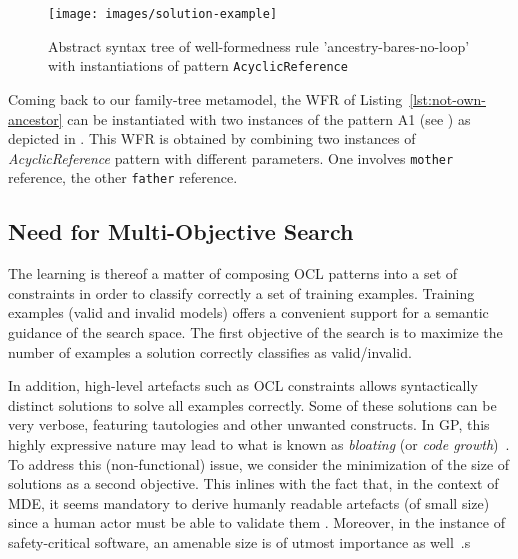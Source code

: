 \begin{figure}[h]
	\texttt{[image: images/solution-example]}
	\caption{Abstract syntax tree of well-formedness rule 'ancestry-bares-no-loop' with instantiations of pattern \texttt{AcyclicReference}}
	\label{fig:representation-pattern}
\end{figure}

Coming back to our family-tree metamodel, the WFR of Listing~\ref{lst:not-own-ancestor}  can be instantiated with two instances of the pattern A1 (see ) as depicted in . This WFR is obtained by combining two instances of \textit{AcyclicReference} pattern with different parameters. One involves \texttt{mother} reference, the other \texttt{father} reference.


\subsection{Need for Multi-Objective Search}
\label{sec:fitness}
The learning is thereof a matter of composing OCL patterns into a set of constraints in order to classify correctly a set of training examples.
Training examples (\ie valid and invalid models) offers a convenient support for a semantic guidance of the search space. The first objective of the search is to maximize the number of examples a solution correctly classifies as valid/invalid.


In addition, high-level artefacts such as OCL constraints allows syntactically distinct solutions to solve all examples correctly. 
Some of these solutions can be very verbose, featuring tautologies and other unwanted constructs. In GP, this highly expressive nature may lead to what is known as \textit{bloating} (or \textit{code growth})~\citep{luke2006}. 
To address this (non-functional) issue, we consider the minimization of the size of solutions as a second objective. This inlines with the fact that, in the context of MDE, it seems mandatory to derive humanly readable artefacts (\ie of small size) since a human actor must be able to validate them \citep{lu2019-refactorOCL}. Moreover, in the instance of safety-critical software, an amenable size is of utmost importance as well~\citep{schumann2016-nasa-mbswe}.s

